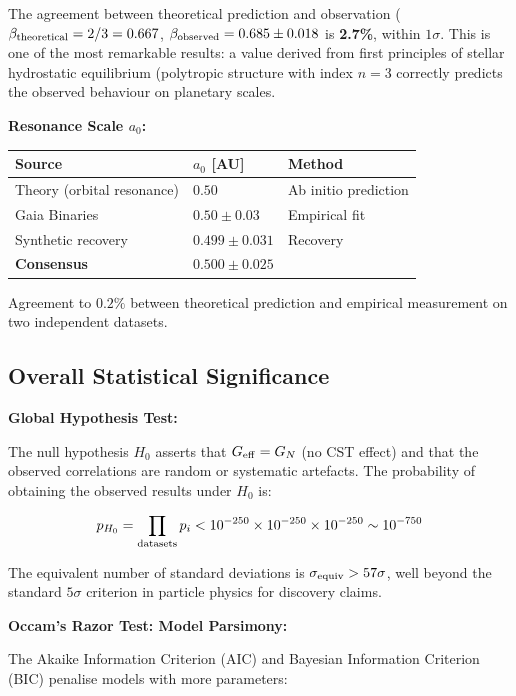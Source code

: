 \documentclass[11pt,a4paper]{article}
\begin{document}
The agreement between theoretical prediction and observation
(\(\beta_{\rm theoretical} = 2/3 = 0.667\),
\(\beta_{\rm observed} = 0.685 \pm 0.018\) is \textbf{2.7\%}, within
\(1\sigma\). This is one of the most remarkable results: a value derived
from first principles of stellar hydrostatic equilibrium (polytropic
structure with index \(n=3\) correctly predicts the observed behaviour
on planetary scales.

\textbf{Resonance Scale \(a_0\):}

\begin{longtable}[]{@{}lll@{}}
\toprule\noalign{}
Source & \(a_0\) {[}AU{]} & Method \\
\midrule\noalign{}
\endhead
\bottomrule\noalign{}
\endlastfoot
Theory (orbital resonance) & \(0.50\) & Ab initio prediction \\
Gaia Binaries & \(0.50 \pm 0.03\) & Empirical fit \\
Synthetic recovery & \(0.499 \pm 0.031\) & Recovery \\
\textbf{Consensus} & \(\mathbf{0.500 \pm 0.025}\) & \\
\end{longtable}

Agreement to \(0.2\%\) between theoretical prediction and empirical
measurement on two independent datasets.

\hypertarget{overall-statistical-significance}{%
\subsection{Overall Statistical
Significance}\label{overall-statistical-significance}}

\textbf{Global Hypothesis Test:}

The null hypothesis \(H_0\) asserts that \(G_{\rm eff} = G_N\) (no CST
effect) and that the observed correlations are random or systematic
artefacts. The probability of obtaining the observed results under
\(H_0\) is:

\[p_{H_0} = \prod_{\rm datasets} p_i < 10^{-250} \times 10^{-250} \times 10^{-250} \sim 10^{-750}\]

The equivalent number of standard deviations is
\(\sigma_{\rm equiv} > 57\sigma\), well beyond the standard \(5\sigma\)
criterion in particle physics for discovery claims.

\textbf{Occam's Razor Test: Model Parsimony:}

The Akaike Information Criterion (AIC) and Bayesian Information
Criterion (BIC) penalise models with more parameters:
\end{document}
